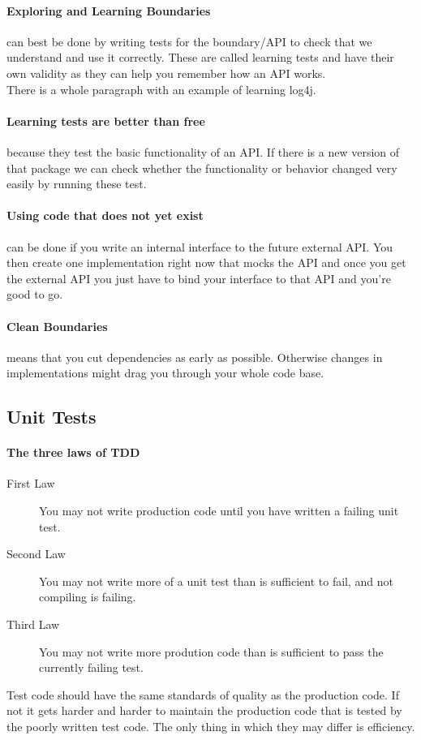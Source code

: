 \documentclass[a4paper, twocolumn]{article}
\begin{document}
\paragraph{Exploring and Learning Boundaries} can best be done by writing tests for the boundary/API to check that we understand and use it correctly. These are called learning tests and have their own validity as they can help you remember how an API works.\\
There is a whole paragraph with an example of learning log4j.
\paragraph{Learning tests are better than free} because they test the basic functionality of an API. If there is a new version of that package we can check whether the functionality or behavior changed very easily by running these test.
\paragraph{Using code that does not yet exist} can be done if you write an internal interface to the future external API. You then create one implementation right now that mocks the API and once you get the external API you just have to bind your interface to that API and you're good to go.
\paragraph{Clean Boundaries} means that you cut dependencies as early as possible. Otherwise changes in implementations might drag you through your whole code base.

\subsection{Unit Tests}
\paragraph{The three laws of TDD}
\begin{description}
	\item[First Law] You may not write production code until you have written a failing unit test.
	\item[Second Law] You may not write more of a unit test than is sufficient to fail, and not compiling is failing.
	\item[Third Law] You may not write more prodution code than is sufficient to pass the currently failing test.
\end{description}
Test code should have the same standards of quality as the production code. If not it gets harder and harder to maintain the production code that is tested by the poorly written test code. The only thing in which they may differ is efficiency.
\end{document}
